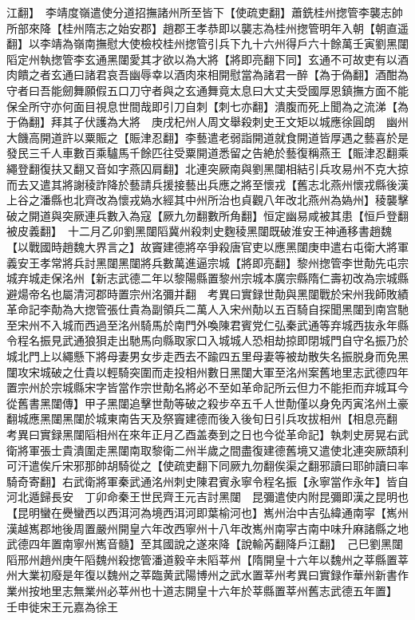 江翻】　李靖度嶺遣使分道招撫諸州所至皆下【使疏吏翻】蕭銑桂州揔管李襲志帥所部來降【桂州隋志之始安郡】趙郡王孝恭即以襲志為桂州揔管明年入朝【朝直遥翻】以李靖為嶺南撫慰大使檢校桂州揔管引兵下九十六州得戶六十餘萬壬寅劉黑闥䧟定州執揔管李玄通黑闥愛其才欲以為大將【將即亮翻下同】玄通不可故吏有以酒肉饋之者玄通曰諸君哀吾幽辱幸以酒肉來相開慰當為諸君一醉【為于偽翻】酒酣為守者曰吾能劒舞願假五口刀守者與之玄通舞竟太息曰大丈夫受國厚恩鎮撫方面不能保全所守亦何面目視息世間哉即引刀自刺【刺七亦翻】潰腹而死上聞為之流涕【為于偽翻】拜其子伏護為大將　庚戌杞州人周文舉殺刺史王文矩以城應徐圓朗　幽州大饑高開道許以粟賑之【賑津忍翻】李藝遣老弱詣開道就食開道皆厚遇之藝喜於是發民三千人車數百乘驢馬千餘匹往受粟開道悉留之告絶於藝復稱燕王【賑津忍翻乘繩登翻復扶又翻又音如字燕囚肩翻】北連突厥南與劉黑闥相結引兵攻易州不克大掠而去又遣其將謝稜詐降於藝請兵援接藝出兵應之將至懷戎【舊志北燕州懷戎縣後漢上谷之潘縣也北齊改為懷戎媯水經其中州所治也貞觀八年改北燕州為媯州】稜襲擊破之開道與突厥連兵數入為寇【厥九勿翻數所角翻】恒定幽易咸被其患【恒戶登翻被皮義翻】　十二月乙卯劉黑闥䧟冀州殺刺史麴稜黑闥既破淮安王神通移書趙魏【以戰國時趙魏大界言之】故竇建德將卒爭殺唐官吏以應黑闥庚申遣右屯衛大將軍義安王孝常將兵討黑闥黑闥將兵數萬進逼宗城【將即亮翻】黎州揔管李世勣先屯宗城弃城走保洺州【新志武德二年以黎陽縣置黎州宗城本廣宗縣隋仁壽初改為宗城縣避煬帝名也屬清河郡時置宗州洺彌并翻　考異曰實録世勣與黑闥戰於宋州我師敗績革命記李勣為大揔管張仕貴為副領兵二萬人入宋州勣以五百騎自探聞黑闥到南宫馳至宋州不入城而西過至洺州騎馬於南門外喚陳君賓党仁弘秦武通等弃城西抜永年縣令程名振見武通狼狽走出馳馬向縣取家口入城城人恐相劫掠即閉城門自守名振乃於城北門上以繩懸下將母妻男女步走西去不踰四五里母妻等被劫散失名振脱身而免黑闥攻宋城破之仕貴以輕騎突圍而走投相州數日黑闥大軍至洺州案舊地里志武德四年置宗州於宗城縣宋字皆當作宗世勣名將必不至如革命記所云但力不能拒而弃城耳今從舊書黑闥傳】甲子黑闥追擊世勣等破之殺步卒五千人世勣僅以身免丙寅洺州土豪翻城應黑闥黑闥於城東南告天及祭竇建德而後入後旬日引兵攻拔相州【相息亮翻　考異曰實録黑闥䧟相州在來年正月乙酉盖奏到之日也今從革命記】執刺史房晃右武衛將軍張士貴潰圍走黑闥南取黎衛二州半歲之間盡復建德舊境又遣使北連突厥頡利可汗遣俟斤宋邪那帥胡騎從之【使疏吏翻下同厥九勿翻俟渠之翻邪讀曰耶帥讀曰率騎奇寄翻】右武衛將軍秦武通洺州刺史陳君賓永寧令程名振【永寧當作永年】皆自河北遁歸長安　丁卯命秦王世民齊王元吉討黑闥　昆彌遣使内附昆彌即漢之昆明也【昆明蠻在㸑蠻西以西洱河為境西洱河即葉榆河也】嶲州治中吉弘緯通南寜【嶲州漢越嶲郡地後周置嚴州開皇六年改西寧州十八年改嶲州南寜古南中味升麻諸縣之地武德四年置南寧州嶲音髓】至其國說之遂來降【說輸芮翻降戶江翻】　己巳劉黑闥䧟邢州趙州庚午䧟魏州殺揔管潘道毅辛未䧟莘州【隋開皇十六年以魏州之莘縣置莘州大業初廢是年復以魏州之莘臨黄武陽博州之武水置莘州考異曰實録作華州新書作業州按地里志無業州必莘州也十道志開皇十六年於莘縣置莘州舊志武德五年置】　壬申徙宋王元嘉為徐王

